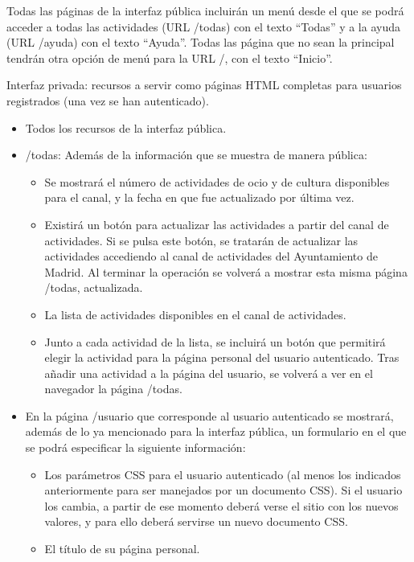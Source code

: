 Todas las páginas de la interfaz pública incluirán un menú desde el que se podrá acceder a todas las actividades (URL /todas) con el texto ``Todas'' y a la ayuda (URL /ayuda) con el texto ``Ayuda''. Todas las página que no sean la principal tendrán otra opción de menú para la URL /, con el texto ``Inicio''.


Interfaz privada: recursos a servir como páginas HTML completas para usuarios registrados (una vez se han autenticado).

\begin{itemize}
  \item Todos los recursos de la interfaz pública.
  \item /todas: Además de la información que se muestra de manera pública:
  \begin{itemize}
    \item Se mostrará el número de actividades de ocio y de cultura disponibles para el canal, y la fecha en que fue actualizado por última vez.
    \item Existirá un botón para actualizar las actividades a partir del canal de actividades. Si se pulsa este botón, se tratarán de actualizar las actividades accediendo al canal de actividades del Ayuntamiento de Madrid. Al terminar la operación se volverá a mostrar esta misma página /todas, actualizada.
    \item La lista de actividades disponibles en el canal de actividades.
    \item Junto a cada actividad de la lista, se incluirá un botón que permitirá elegir la actividad para la página personal del usuario autenticado. Tras añadir una actividad a la página del usuario, se volverá a ver en el navegador la página /todas.
  \end{itemize}

  \item En la página /usuario que corresponde al usuario autenticado se mostrará, además de lo ya mencionado para la interfaz pública, un formulario en el que se podrá especificar la siguiente información:

  \begin{itemize}
    \item Los parámetros CSS para el usuario autenticado (al menos los indicados anteriormente para ser manejados por un documento CSS). Si el usuario los cambia, a partir de ese momento deberá verse el sitio con los nuevos valores, y para ello deberá servirse un nuevo documento CSS.
    \item El título de su página personal.
  \end{itemize}
\end{itemize}

